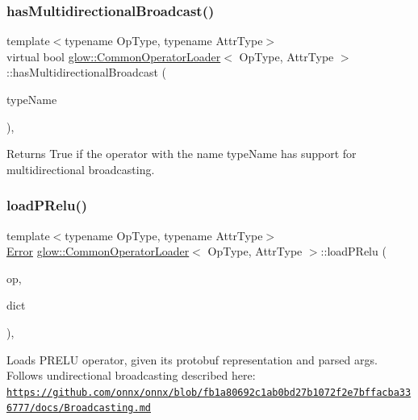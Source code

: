 \subsubsection{\texorpdfstring{has\+Multidirectional\+Broadcast()}{hasMultidirectionalBroadcast()}}
{\footnotesize\ttfamily template$<$typename Op\+Type, typename Attr\+Type$>$ \\
virtual bool \hyperlink{classglow_1_1_common_operator_loader}{glow\+::\+Common\+Operator\+Loader}$<$ Op\+Type, Attr\+Type $>$\+::has\+Multidirectional\+Broadcast (\begin{DoxyParamCaption}\item[{const llvm\+::\+String\+Ref}]{type\+Name }\end{DoxyParamCaption})\hspace{0.3cm}{\ttfamily [protected]}, {}}

\begin{DoxyReturn}{Returns}
True if the operator with the name {\ttfamily type\+Name} has support for multidirectional broadcasting. 
\end{DoxyReturn}
\mbox{\label{classglow_1_1_common_operator_loader_a6a8b5b3d78eab3af16b88b718aeb40c5}} 
\subsubsection{\texorpdfstring{load\+P\+Relu()}{loadPRelu()}}
{\footnotesize\ttfamily template$<$typename Op\+Type, typename Attr\+Type$>$ \\
\hyperlink{namespaceglow_afdb176c3a672ef66db0ecfc19a8d39bf}{Error} \hyperlink{classglow_1_1_common_operator_loader}{glow\+::\+Common\+Operator\+Loader}$<$ Op\+Type, Attr\+Type $>$\+::load\+P\+Relu (\begin{DoxyParamCaption}\item[{const Op\+Type \&}]{op,  }\item[{Argument\+Dictionary\+Ty \&}]{dict }\end{DoxyParamCaption})\hspace{0.3cm}{\ttfamily [inline]}, {\ttfamily [protected]}}

Loads P\+R\+E\+LU operator, given its protobuf representation and parsed args. Follows undirectional broadcasting described here\+: \href{https://github.com/onnx/onnx/blob/fb1a80692c1ab0bd27b1072f2e7bffacba336777/docs/Broadcasting.md}{\tt https\+://github.\+com/onnx/onnx/blob/fb1a80692c1ab0bd27b1072f2e7bffacba336777/docs/\+Broadcasting.\+md} \mbox{\label{classglow_1_1_common_operator_loader_a308c3bbba0a5e6ee0b50bd972dd6af84}} 
